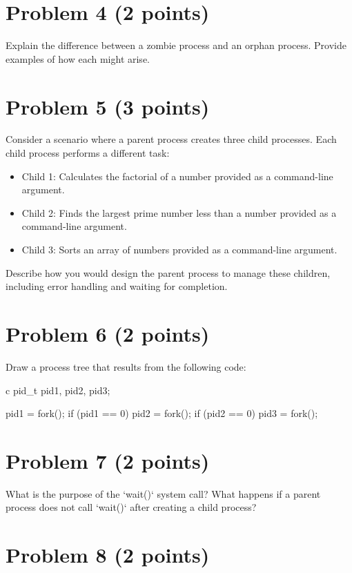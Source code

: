 \documentclass{article}
\begin{document}
\section*{Problem 4 (2 points)}

Explain the difference between a zombie process and an orphan process.  Provide examples of how each might arise.


\section*{Problem 5 (3 points)}

Consider a scenario where a parent process creates three child processes.  Each child process performs a different task:
\begin{itemize}
    \item Child 1: Calculates the factorial of a number provided as a command-line argument.
    \item Child 2: Finds the largest prime number less than a number provided as a command-line argument.
    \item Child 3: Sorts an array of numbers provided as a command-line argument.
\end{itemize}
Describe how you would design the parent process to manage these children, including error handling and waiting for completion.


\section*{Problem 6 (2 points)}

Draw a process tree that results from the following code:

c
pid_t pid1, pid2, pid3;

pid1 = fork();
if (pid1 == 0) {
    pid2 = fork();
    if (pid2 == 0) {
        pid3 = fork();
    }
}


\section*{Problem 7 (2 points)}

What is the purpose of the `wait()` system call?  What happens if a parent process does not call `wait()` after creating a child process?


\section*{Problem 8 (2 points)}
\end{document}
